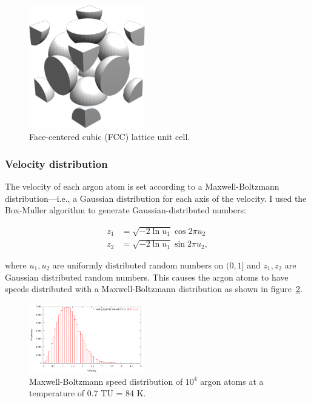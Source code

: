 \documentclass[twocolumn]{revtex4}
\begin{document}
\begin{figure}[htb]
\begin{center}
\leavevmode
\includegraphics[width=0.45\textwidth]{fcc.png}
\end{center}
\caption{Face-centered cubic (FCC) lattice unit cell.}
\label{fig:fcc}
\end{figure}

\subsubsection{Velocity distribution}
\label{sec:vel-dist}

The velocity of each argon atom is set according to a Maxwell-Boltzmann distribution---i.e., a Gaussian distribution for each axis of the velocity. I used the Box-Muller algorithm to generate Gaussian-distributed numbers:

\begin{align}
z_1 &= \sqrt{-2 \ln u_1} \cos{2 \pi u_2}\\
z_2 &= \sqrt{-2 \ln u_1} \sin{2 \pi u_2},
\end{align}

where $u_1, u_2$ are uniformly distributed random numbers on $(0,1]$ and $z_1, z_2$ are Gaussian distributed random numbers. This causes the argon atoms to have speeds distributed with a Maxwell-Boltzmann distribution as shown in figure~\ref{fig:vel-dist}.

\begin{figure}[htb]
\begin{center}
\leavevmode
\includegraphics[width=0.45\textwidth]{vel-dist.png}
\end{center}
\caption{Maxwell-Boltzmann speed distribution of $10^4$ argon atoms at a temperature of 0.7 TU = 84 K.}
\label{fig:vel-dist}
\end{figure}
\end{document}
